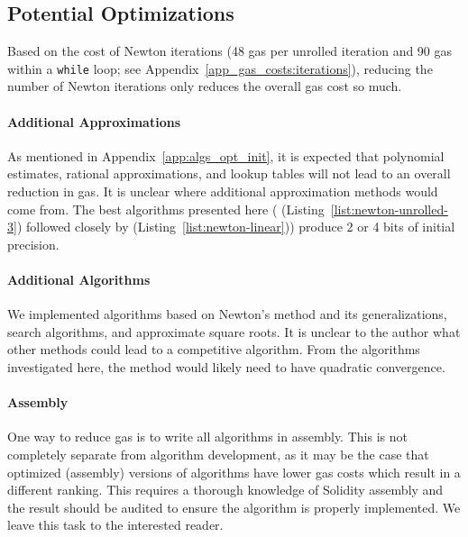 



\subsection{Potential Optimizations}

Based on the cost of Newton iterations (48 gas per unrolled iteration
and 90 gas within a \texttt{while} loop;
see Appendix~\ref{app_gas_costs:iterations}),
reducing the number of Newton iterations only reduces the overall
gas cost so much.

\paragraph{Additional Approximations}
As mentioned in Appendix~\ref{app:algs_opt_init},
it is expected that polynomial estimates, rational approximations,
and lookup tables will not lead to an overall reduction in gas.
It is unclear where additional approximation methods would come from.
The best algorithms presented here
(\UnrolledThree{} (Listing~\ref{list:newton-unrolled-3})
followed closely by \Linear{} (Listing~\ref{list:newton-linear}))
produce 2 or 4 bits of initial precision.

\paragraph{Additional Algorithms}
We implemented algorithms based on Newton's method
and its generalizations, search algorithms,
and approximate square roots.
It is unclear to the author what other methods could lead
to a competitive algorithm.
From the algorithms investigated here,
the method would likely need to have quadratic convergence.

\paragraph{Assembly}
One way to reduce gas is to write all algorithms in assembly.
This is not completely separate from algorithm development,
as it may be the case that optimized (assembly) versions
of algorithms have lower gas costs which result in a different ranking.
This requires a thorough knowledge of Solidity assembly
and the result should be audited to ensure the algorithm
is properly implemented.
We leave this task to the interested reader.
